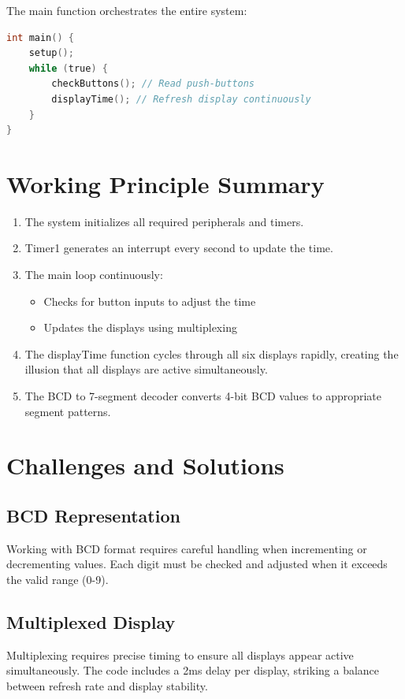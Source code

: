 \documentclass[12pt]{article}
\begin{document}
The main function orchestrates the entire system:

\begin{lstlisting}[language=C, caption=Main Function]
int main() {
    setup();
    while (true) {
        checkButtons(); // Read push-buttons
        displayTime(); // Refresh display continuously
    }
}
\end{lstlisting}

\section{Working Principle Summary}

\begin{enumerate}
    \item The system initializes all required peripherals and timers.
    \item Timer1 generates an interrupt every second to update the time.
    \item The main loop continuously:
        \begin{itemize}
            \item Checks for button inputs to adjust the time
            \item Updates the displays using multiplexing
        \end{itemize}
    \item The displayTime function cycles through all six displays rapidly, creating the illusion that all displays are active simultaneously.
    \item The BCD to 7-segment decoder converts 4-bit BCD values to appropriate segment patterns.
\end{enumerate}

\section{Challenges and Solutions}

\subsection{BCD Representation}
Working with BCD format requires careful handling when incrementing or decrementing values. Each digit must be checked and adjusted when it exceeds the valid range (0-9).

\subsection{Multiplexed Display}
Multiplexing requires precise timing to ensure all displays appear active simultaneously. The code includes a 2ms delay per display, striking a balance between refresh rate and display stability.
\end{document}
